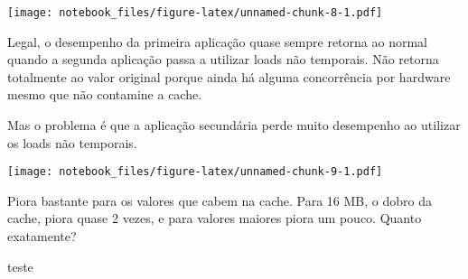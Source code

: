 \documentclass[
]{article}
\newenvironment{Shaded}{\begin{snugshade}}{\end{snugshade}}
\newcommand{\DataTypeTok}[1]{\textcolor[rgb]{0.13,0.29,0.53}{#1}}
\newcommand{\DecValTok}[1]{\textcolor[rgb]{0.00,0.00,0.81}{#1}}
\newcommand{\KeywordTok}[1]{\textcolor[rgb]{0.13,0.29,0.53}{\textbf{#1}}}
\newcommand{\NormalTok}[1]{#1}
\newcommand{\OperatorTok}[1]{\textcolor[rgb]{0.81,0.36,0.00}{\textbf{#1}}}
\newcommand{\StringTok}[1]{\textcolor[rgb]{0.31,0.60,0.02}{#1}}
\begin{document}
\texttt{[image: notebook\_files/figure-latex/unnamed-chunk-8-1.pdf]}

Legal, o desempenho da primeira aplicação quase sempre retorna ao normal
quando a segunda aplicação passa a utilizar loads não temporais. Não
retorna totalmente ao valor original porque ainda há alguma concorrência
por hardware mesmo que não contamine a cache.

Mas o problema é que a aplicação secundária perde muito desempenho ao
utilizar os loads não temporais.

\begin{Shaded}
\end{Shaded}

\texttt{[image: notebook\_files/figure-latex/unnamed-chunk-9-1.pdf]}

Piora bastante para os valores que cabem na cache. Para 16 MB, o dobro
da cache, piora quase 2 vezes, e para valores maiores piora um pouco.
Quanto exatamente?

teste

\begin{Shaded}
\end{Shaded}
\end{document}
